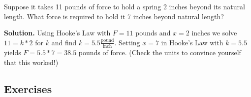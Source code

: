 \medskip

\begin{ex} \label{findingkinvariation} Suppose it takes 11 pounds of force to hold a spring 2 inches beyond its natural length.  What force is required to hold it 7 inches beyond natural length?

\smallskip

{\bf Solution.}  Using Hooke's Law with $F = 11$ pounds and $x = 2$ inches we solve $11 = k*2$ for $k$ and find $k = 5.5 \frac{\text{pound}}{\text{inch}}$.  Setting $x = 7$ in Hooke's Law with $k = 5.5$ yields $F = 5.5*7 = 38.5$ pounds of force.  (Check the units to convince yourself that this worked!)

\end{ex}

\newpage

\subsection{Exercises}



\closegraphsfile